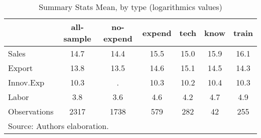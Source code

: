 \begin{table}[htbp]\centering
\def\sym#1{\ifmmode^{#1}\else\(^{#1}\)\fi}
\caption{Summary Stats Mean, by type (logarithmics values)}
\begin{tabular}{l*{6}{c}}
\hline\hline
                    &  all-sample&   no-expend&      expend&        tech&        know&       train\\
\hline
Sales               &        14.7&        14.4&        15.5&        15.0&        15.9&        16.1\\
Export              &        13.8&        13.5&        14.6&        15.1&        14.5&        14.3\\
Innov.Exp           &        10.3&           .&        10.3&        10.2&        10.4&        10.3\\
Labor               &         3.8&         3.6&         4.6&         4.2&         4.7&         4.9\\
\hline
Observations        &        2317&        1738&         579&         282&          42&         255\\
\hline\hline
\multicolumn{7}{l}{\footnotesize Source: Authors elaboration.}\\
\end{tabular}
\end{table}

